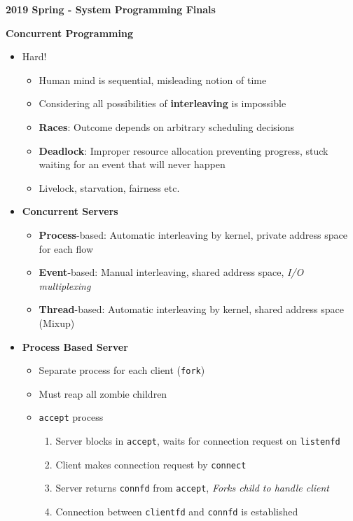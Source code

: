 \documentclass[12pt]{article}
\newcommand{\cname}[1]{\large \textbf{#1}}
\begin{document}
{\sffamily
\begin{center}
	\textbf{\large 2019 Spring - System Programming Finals}
\end{center}
\cname{Concurrent Programming}
\begin{itemize}
	\item Hard!
	\begin{itemize}
		\item Human mind is sequential, misleading notion of time
		\item Considering all possibilities of \textbf{interleaving} is impossible
		\item \textbf{Races}: Outcome depends on arbitrary scheduling decisions
		\item \textbf{Deadlock}: Improper resource allocation preventing progress, stuck waiting for an event that will never happen
		\item Livelock, starvation, fairness etc.
	\end{itemize}
	\item \textbf{Concurrent Servers}
	\begin{itemize}
		\item \textbf{Process}-based: Automatic interleaving by kernel, private address space for each flow
		\item \textbf{Event}-based: Manual interleaving, shared address space, \textit{I/O multiplexing}
		\item \textbf{Thread}-based: Automatic interleaving by kernel, shared address space (Mixup)
	\end{itemize}
	\item \textbf{Process Based Server}
	\begin{itemize}
		\item Separate process for each client (\texttt{fork})
		\item Must reap all zombie children
		\item \texttt{accept} process
		\begin{enumerate}
			\item Server blocks in \texttt{accept}, waits for connection request on \texttt{listenfd}
			\item Client makes connection request by \texttt{connect}
			\item Server returns \texttt{connfd} from \texttt{accept}, \textit{Forks child to handle client}
			\item Connection between \texttt{clientfd} and \texttt{connfd} is established  
		\end{enumerate}

\end{itemize}
\end{itemize}}
\end{document}
